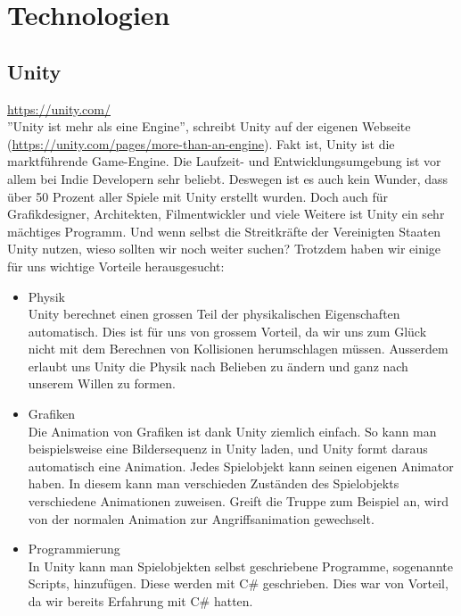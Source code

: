\chapter{Technologien}

\section{Unity}
\url{https://unity.com/}\\
''Unity ist mehr als eine Engine'', schreibt Unity auf der eigenen Webseite (\url{https://unity.com/pages/more-than-an-engine}). Fakt ist, Unity ist die marktführende Game-Engine. Die Laufzeit- und Entwicklungsumgebung 
ist vor allem bei \gls{Indie Developer}n sehr beliebt. Deswegen ist es auch kein Wunder, dass über 50 Prozent aller Spiele mit Unity erstellt wurden. 
Doch auch für Grafikdesigner, Architekten, Filmentwickler und viele Weitere ist Unity ein sehr mächtiges Programm. Und wenn selbst die Streitkräfte der Vereinigten Staaten Unity nutzen, wieso sollten wir 
noch weiter suchen? Trotzdem haben wir einige für uns wichtige Vorteile herausgesucht:\\

\begin{itemize}
    \item Physik \\
        Unity berechnet einen grossen Teil der physikalischen Eigenschaften automatisch. Dies ist für uns von grossem Vorteil, da wir uns zum Glück nicht mit dem Berechnen von Kollisionen herumschlagen müssen.
        Ausserdem erlaubt uns Unity die Physik nach Belieben zu ändern und ganz nach unserem Willen zu formen.
    \item Grafiken \\
    Die Animation von Grafiken ist dank Unity ziemlich einfach. So kann man beispielsweise eine Bildersequenz in Unity laden, und Unity formt daraus automatisch eine Animation. Jedes Spielobjekt kann seinen
        eigenen Animator haben. In diesem kann man verschieden Zuständen des Spielobjekts verschiedene Animationen zuweisen. Greift die Truppe zum Beispiel an, wird von der normalen Animation zur Angriffsanimation
        gewechselt.
    \item Programmierung \\
    In Unity kann man Spielobjekten selbst geschriebene Programme, sogenannte Scripts, hinzufügen. Diese werden mit C\# geschrieben. Dies war von Vorteil, da wir bereits Erfahrung mit C\# hatten. 
\end{itemize}

